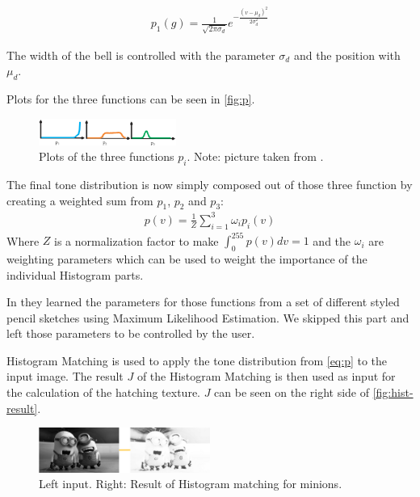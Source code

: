 \begin{align}
  p_1(g) = \frac{1}{\sqrt{2\pi \sigma_d}} e^{-\frac{(v-\mu_d)^2}{2\sigma_d^2}} 
  \label{eq:p_3}
\end{align}

The width of the bell is controlled with the parameter $\sigma_d$ and the
position with $\mu_d$.

Plots for the three functions can be seen in \autoref{fig:p}.

\begin{figure}[htb]
  \centering
  \includegraphics[width=0.4\textwidth]{images/p_i.png}
  \caption{Plots of the three functions $p_i$. Note: picture taken from
    \cite{mainPaper}.}
  \label{fig:p}
\end{figure}

The final tone distribution is now simply composed out of those three
function by creating a weighted sum from $p_1$, $p_2$ and $p_3$:
\begin{align}
  p(v) = \frac{1}{Z} \sum_{i=1}^{3}\omega_i p_i(v)
  \label{eq:p}
\end{align}
Where $Z$ is a normalization factor to make $\int_0^{255}p(v)dv = 1$ and the
$\omega_i$ are weighting parameters which can be used to weight the importance of
the individual Histogram parts.

In \cite{mainPaper} they learned the parameters for those functions from a set
of different styled pencil sketches using Maximum Likelihood Estimation. We skipped this part and left those
parameters to be controlled by the user.

Histogram Matching is used to apply the tone distribution from \autoref{eq:p} to
the input image. The result $J$ of the Histogram Matching is then used as input
for the calculation of the hatching texture.  $J$ can be seen on the right side
of \autoref{fig:hist-result}.

\begin{figure}[htb]
  \centering
  \includegraphics[width=0.5\textwidth]{images/tone-result.png}
  \caption{Left input. Right: Result of Histogram matching for minions.}
  \label{fig:hist-result}
\end{figure}

